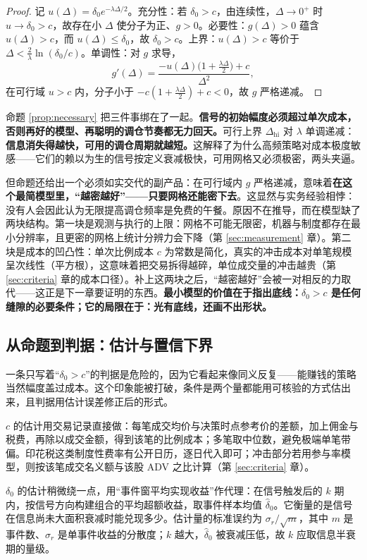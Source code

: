 \begin{proof}
记 $u(\Delta)=\delta_0 e^{-\lambda\Delta/2}$。充分性：若 $\delta_0>c$，由连续性，$\Delta\to 0^{+}$ 时 $u\to\delta_0>c$，故存在小 $\Delta$ 使分子为正、$g>0$。必要性：$g(\Delta)>0$ 蕴含 $u(\Delta)>c$，而 $u(\Delta)\le\delta_0$，故 $\delta_0>c$。上界：$u(\Delta)>c$ 等价于 $\Delta<\frac{2}{\lambda}\ln(\delta_0/c)$。单调性：对 $g$ 求导，
\[
  g'(\Delta)=\frac{-u(\Delta)\bigl(1+\tfrac{\lambda\Delta}{2}\bigr)+c}{\Delta^2},
\]
在可行域 $u>c$ 内，分子小于 $-c(1+\frac{\lambda\Delta}{2})+c<0$，故 $g$ 严格递减。
\end{proof}

命题 \ref{prop:necessary} 把三件事绑在了一起。\textbf{信号的初始幅度必须超过单次成本，否则再好的模型、再聪明的调仓节奏都无力回天。}可行上界 $\Delta_{\mathrm{hi}}$ 对 $\lambda$ 单调递减：\textbf{信息消失得越快，可用的调仓周期就越短。}这解释了为什么高频策略对成本极度敏感——它们的赖以为生的信号按定义衰减极快，可用网格又必须极密，两头夹逼。

但命题还给出一个必须如实交代的副产品：在可行域内 $g$ 严格递减，意味着\textbf{在这个最简模型里，“越密越好”——只要网格还能密下去}。这显然与实务经验相悖：没有人会因此认为无限提高调仓频率是免费的午餐。原因不在推导，而在模型缺了两块结构。第一块是观测与执行的上限：网格不可能无限密，机器与制度都存在最小分辨率，且更密的网格上统计分辨力会下降（第 \ref{sec:measurement} 章）。第二块是成本的凹凸性：单次比例成本 $c$ 为常数是简化，真实的冲击成本对单笔规模呈次线性（平方根），这意味着把交易拆得越碎，单位成交量的冲击越贵（第 \ref{sec:criteria} 章的成本口径）。补上这两块之后，“越密越好”会被一对相反的力取代——这正是下一章要证明的东西。\textbf{最小模型的价值在于指出底线：$\delta_0>c$ 是任何缝隙的必要条件；它的局限在于：光有底线，还画不出形状。}

\subsection{从命题到判据：估计与置信下界}

一条只写着“$\delta_0>c$”的判据是危险的，因为它看起来像同义反复——能赚钱的策略当然幅度盖过成本。这个印象能被打破，条件是两个量都能用可核验的方式估出来，且判据用估计误差修正后的形式。

$c$ 的估计用交易记录直接做：每笔成交均价与决策时点参考价的差额，加上佣金与税费，再除以成交金额，得到该笔的比例成本；多笔取中位数，避免极端单笔带偏。印花税这类制度性费率有公开日历，逐日代入即可；冲击部分若用参与率模型，则按该笔成交名义额与该股 ADV 之比计算（第 \ref{sec:criteria} 章）。

$\delta_0$ 的估计稍微绕一点，用“事件窗平均实现收益”作代理：在信号触发后的 $k$ 期内，按信号方向构建组合的平均超额收益，取事件样本均值 $\hat\delta_0$。它衡量的是信号在信息尚未大面积衰减时能兑现多少。估计量的标准误约为 $\sigma_r/\sqrt{m}$，其中 $m$ 是事件数、$\sigma_r$ 是单事件收益的分散度；$k$ 越大，$\hat\delta_0$ 被衰减压低，故 $k$ 应取信息半衰期的量级。

